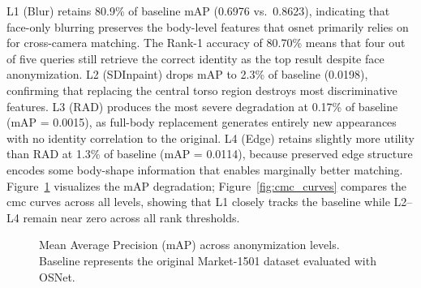 L1 (Blur) retains 80.9\% of baseline mAP (0.6976 vs.\ 0.8623), indicating that face-only blurring preserves the body-level features that \acrshort{osnet} primarily relies on for cross-camera matching. The Rank-1 accuracy of 80.70\% means that four out of five queries still retrieve the correct identity as the top result despite face anonymization. L2 (SDInpaint) drops mAP to 2.3\% of baseline (0.0198), confirming that replacing the central torso region destroys most discriminative features. L3 (RAD) produces the most severe degradation at 0.17\% of baseline (mAP = 0.0015), as full-body replacement generates entirely new appearances with no identity correlation to the original. L4 (Edge) retains slightly more utility than RAD at 1.3\% of baseline (mAP = 0.0114), because preserved edge structure encodes some body-shape information that enables marginally better matching. Figure~\ref{fig:map_comparison} visualizes the mAP degradation; Figure~\ref{fig:cmc_curves} compares the \acrlong{cmc} curves across all levels, showing that L1 closely tracks the baseline while L2--L4 remain near zero across all rank thresholds.

\begin{figure}[H]
    \centering
    \caption{Mean Average Precision (mAP) across anonymization levels. Baseline represents the original Market-1501 dataset evaluated with OSNet.}
    \label{fig:map_comparison}
\end{figure}


